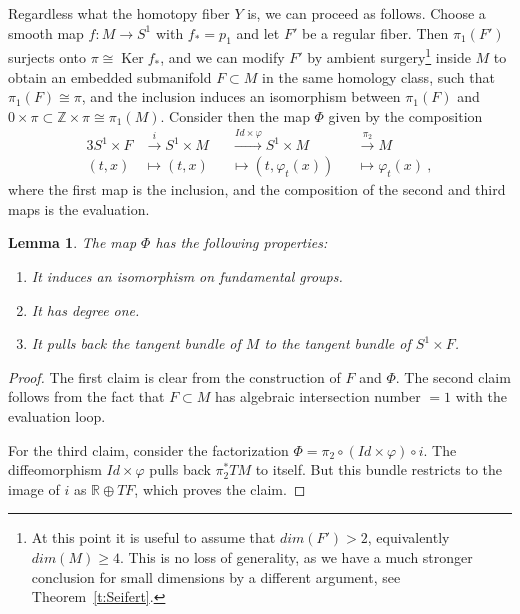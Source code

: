 \documentclass[12pt]{amsart}
\newtheorem{lemma}[theorem]{Lemma}
\theoremstyle{definition}
\theoremstyle{remark}
\def\bZ{{\mathbb Z}}
\def\bR{{\mathbb R}}
\newcommand\Ker{\operatorname{Ker}}
\begin{document}
    Regardless what the homotopy fiber $Y$ is, we can proceed as follows.
    Choose a smooth map $f\colon M\rightarrow S^{1}$ with $f_{*}=p_{1}$ and let 
    $F'$ be a regular fiber. Then $\pi_{1} (F')$ surjects onto $\pi\cong \Ker f_{*}$, 
    and we can modify $F'$ by ambient surgery\footnote{At this point it is useful 
    to assume that $dim (F')>2$, equivalently $dim (M)\geq 4$. This is no loss of 
    generality, as we have a much stronger conclusion for small dimensions by a 
    different argument, see Theorem~\ref{t:Seifert}.} inside $M$ to obtain an 
    embedded submanifold $F\subset M$ in the same homology class, such that 
    $\pi_{1}(F)\cong\pi$, and the inclusion induces an isomorphism between 
    $\pi_{1}(F)$ and $0\times\pi\subset\bZ\times\pi\cong\pi_{1}(M)$. 
    Consider then the map $\Phi$ given by the composition
    \begin{alignat*}{3}
    S^{1} \times F &\stackrel{i}{\longrightarrow} S^1\times M &&\stackrel{Id\times\varphi}{\longrightarrow} S^1\times M &&\stackrel{\pi_2}{\longrightarrow} M\\
    (t,x) &\longmapsto (t,x) &&\longmapsto (t,\varphi_{t}(x)) &&\longmapsto\varphi_{t}(x)  \ ,
    \end{alignat*}
    where the first map is the inclusion, and the composition of the second and third maps is the evaluation.
\begin{lemma}\label{l:class}
The map $\Phi$ has the following properties:
\begin{enumerate}
\item It induces an isomorphism on fundamental groups.
\item It has degree one.
\item It pulls back the tangent bundle of $M$ to the tangent bundle of $S^{1}\times F$.
\end{enumerate}
\end{lemma}
\begin{proof}
The first claim is clear from the construction of $F$ and $\Phi$. The second claim 
follows from the fact that $F\subset M$ has algebraic intersection number $=1$ with 
the evaluation loop.

For the third claim, consider the factorization $\Phi = \pi_2\circ(Id\times\varphi) \circ i$. 
The diffeomorphism $Id\times\varphi$ pulls back $\pi_2^*TM$ to itself. But this bundle
restricts to the image of $i$ as $\bR\oplus TF$, which proves the claim. 
\end{proof}
\end{document}
